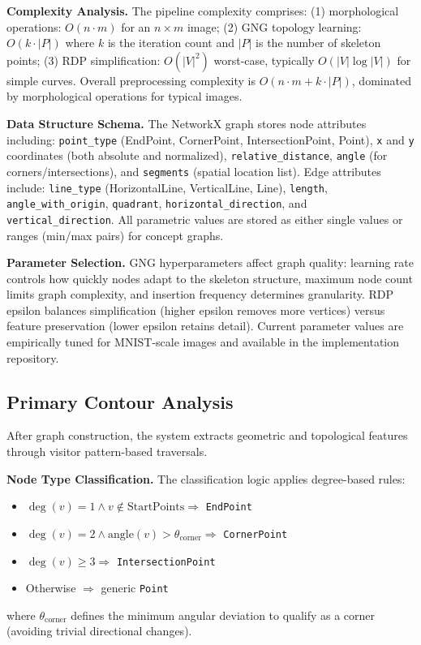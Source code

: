 \documentclass[12pt, a4paper]{article}
\begin{document}
\textbf{Complexity Analysis.} The pipeline complexity comprises: (1) morphological operations: $O(n \cdot m)$ for an $n \times m$ image; (2) GNG topology learning: $O(k \cdot |P|)$ where $k$ is the iteration count and $|P|$ is the number of skeleton points; (3) RDP simplification: $O(|V|^2)$ worst-case, typically $O(|V| \log |V|)$ for simple curves. Overall preprocessing complexity is $O(n \cdot m + k \cdot |P|)$, dominated by morphological operations for typical images.

\textbf{Data Structure Schema.} The NetworkX graph stores node attributes including: \texttt{point\_type} (EndPoint, CornerPoint, IntersectionPoint, Point), \texttt{x} and \texttt{y} coordinates (both absolute and normalized), \texttt{relative\_distance}, \texttt{angle} (for corners/intersections), and \texttt{segments} (spatial location list). Edge attributes include: \texttt{line\_type} (HorizontalLine, VerticalLine, Line), \texttt{length}, \texttt{angle\_with\_origin}, \texttt{quadrant}, \texttt{horizontal\_direction}, and \texttt{vertical\_direction}. All parametric values are stored as either single values or ranges (min/max pairs) for concept graphs.

\textbf{Parameter Selection.} GNG hyperparameters affect graph quality: learning rate controls how quickly nodes adapt to the skeleton structure, maximum node count limits graph complexity, and insertion frequency determines granularity. RDP epsilon balances simplification (higher epsilon removes more vertices) versus feature preservation (lower epsilon retains detail). Current parameter values are empirically tuned for MNIST-scale images and available in the implementation repository.

\subsection{Primary Contour Analysis}

After graph construction, the system extracts geometric and topological features through visitor pattern-based traversals.

\textbf{Node Type Classification.} The classification logic applies degree-based rules:
\begin{itemize}
\item $\deg(v) = 1 \land v \notin \text{StartPoints} \Rightarrow$ \texttt{EndPoint}
\item $\deg(v) = 2 \land \text{angle}(v) > \theta_{\text{corner}} \Rightarrow$ \texttt{CornerPoint}
\item $\deg(v) \geq 3 \Rightarrow$ \texttt{IntersectionPoint}
\item Otherwise $\Rightarrow$ generic \texttt{Point}
\end{itemize}
where $\theta_{\text{corner}}$ defines the minimum angular deviation to qualify as a corner (avoiding trivial directional changes).
\end{document}
